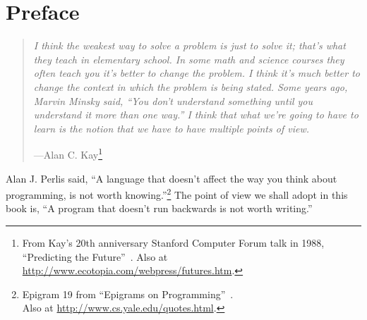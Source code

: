 \chapter{Preface}\label{sec:preface}

\vspace{-1cm}

\begin{quotation}
\noindent
\emph{I think the weakest way to solve a problem is just to solve it; that's what they teach in elementary school. In some math and science courses they often teach you it's better to change the problem. I think it's much better to change the context in which the problem is being stated. Some years ago, Marvin Minsky said, ``You don't understand something until you understand it more than one way.'' I think that what we're going to have to learn is the notion that we have to have multiple points of view.}
\begin{flushright}
\vspace{-0.5em}
---Alan C. Kay\footnote{From Kay's 20th anniversary Stanford Computer Forum talk in 1988, ``Predicting the Future''~\cite{Kay:1989}. Also at \url{http://www.ecotopia.com/webpress/futures.htm}.}
\end{flushright}
\end{quotation}



Alan J. Perlis said, ``A language that doesn't affect the way you think about programming, is not worth knowing.''\footnote{Epigram 19 from ``Epigrams on Programming''~\cite{Perlis:1982:SFE:947955.1083808}.\\Also at \url{http://www.cs.yale.edu/quotes.html}.}
%
The point of view we shall adopt in this book is, ``A program that doesn't run backwards is not worth writing.''

%




